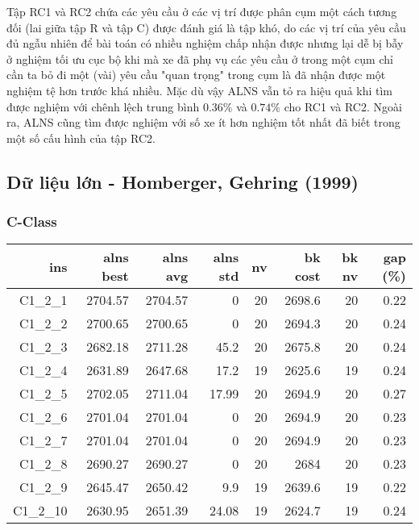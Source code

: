   Tập RC1 và RC2 chứa các yêu cầu ở các vị trí được phân cụm một cách tương đối (lai giữa tập R và tập C) được đánh giá là tập khó, do các vị trí của yêu cầu đủ ngẫu nhiên để bài toán có nhiều nghiệm chấp nhận được nhưng lại dễ bị bẫy ở nghiệm tối ưu cục bộ khi mà xe đã phụ vụ các yêu cầu ở trong một cụm chỉ cần ta bỏ đi một (vài) yêu cầu "quan trọng" trong cụm là đã nhận được một nghiệm tệ hơn trước khá nhiều. Mặc dù vậy ALNS vẫn tỏ ra hiệu quả khi tìm được nghiệm với chênh lệch trung bình $0.36\%$ và $0.74\%$ cho RC1 và RC2. Ngoài ra, ALNS cũng tìm được nghiệm với số xe ít hơn nghiệm tốt nhất đã biết trong một số cấu hình của tập RC2.

  \subsection{Dữ liệu lớn - Homberger, Gehring (1999)}

  \subsubsection*{C-Class}

  \begin{table}[caption={Kết quả đo với tập HG\_C\_1\_2 200 yêu cầu}, label=exp:HGC12]
    \centering
    \begin{tabular}{rrrrrrrr}
    \hline
    ins & alns best & alns avg & alns std & nv & bk cost & bk nv & gap (\%) \\ \hline
    C1\_2\_1 & 2704.57 & 2704.57 & 0 & 20 & 2698.6 & 20 & 0.22 \\ \hline
    C1\_2\_2 & 2700.65 & 2700.65 & 0 & 20 & 2694.3 & 20 & 0.24 \\ \hline
    C1\_2\_3 & 2682.18 & 2711.28 & 45.2 & 20 & 2675.8 & 20 & 0.24 \\ \hline
    C1\_2\_4 & 2631.89 & 2647.68 & 17.2 & 19 & 2625.6 & 19 & 0.24 \\ \hline
    C1\_2\_5 & 2702.05 & 2711.04 & 17.99 & 20 & 2694.9 & 20 & 0.27 \\ \hline
    C1\_2\_6 & 2701.04 & 2701.04 & 0 & 20 & 2694.9 & 20 & 0.23 \\ \hline
    C1\_2\_7 & 2701.04 & 2701.04 & 0 & 20 & 2694.9 & 20 & 0.23 \\ \hline
    C1\_2\_8 & 2690.27 & 2690.27 & 0 & 20 & 2684 & 20 & 0.23 \\ \hline
    C1\_2\_9 & 2645.47 & 2650.42 & 9.9 & 19 & 2639.6 & 19 & 0.22 \\ \hline
    C1\_2\_10 & 2630.95 & 2651.39 & 24.08 & 19 & 2624.7 & 19 & 0.24 \\ \hline
    \end{tabular}
  \end{table}

